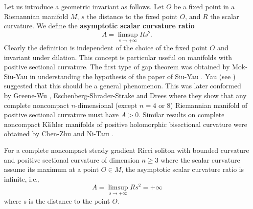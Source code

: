 Let us introduce a geometric invariant as follows. Let $O$ be a
fixed point in a Riemannian manifold $M$, $s$ the distance to the
fixed point $O$, and $R$ the scalar curvature. We define the {\bf
asymptotic scalar curvature ratio}
$$
A=\limsup_{s\rightarrow +\infty}Rs^2.
$$
Clearly the definition is independent of the choice of the fixed
point $O$ and invariant under dilation. This concept is particular
useful on manifolds with positive sectional curvature. The first
type of gap theorem was obtained by Mok-Siu-Yau \cite{MoSY} in
understanding the hypothesis of the paper of Siu-Yau \cite{SiY}.
Yau (see \cite{GW82}) suggested that this should be a general
phenomenon. This was later conformed by Greene-Wu \cite{GW82, GW},
Eschenberg-Shrader-Strake \cite{ESS} and Drees \cite{Dr} where
they show that any complete noncompact $n$-dimensional (except
$n=4$ or 8) Riemannian manifold of positive sectional curvature
must have $A>0$. Similar results on complete noncompact
K$\rm\ddot{a}$hler manifolds of positive holomorphic bisectional
curvature were obtained by Chen-Zhu \cite{CZ03} and Ni-Tam
\cite{NT}.

\begin{theorem}
  \label{thm:cz-asymptotic-scalar-curvature-of-positively-curved-steady-solitons}
For a complete noncompact steady gradient Ricci soliton with
bounded curvature and positive sectional curvature of dimension
$n\ge3$ where the scalar curvature assume its maximum at a point
$O\in M$, the asymptotic scalar curvature ratio is infinite, i.e.,
$$
A=\limsup_{s\rightarrow +\infty}Rs^2=+\infty
$$
where s is the distance to the point $O$.
\end{theorem}

